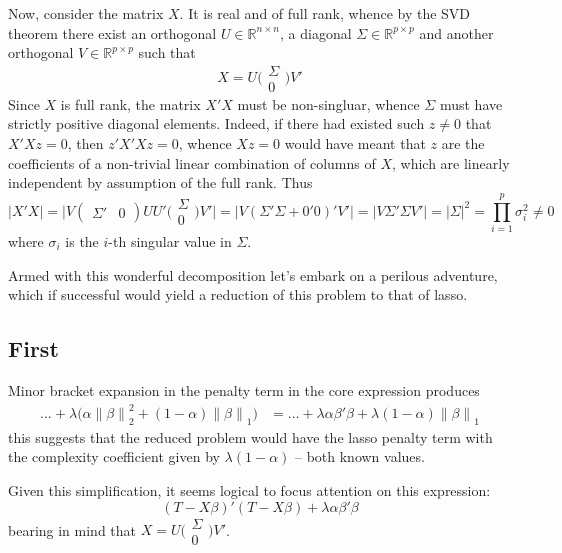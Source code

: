 \documentclass[a4paper]{article}
\newcommand{\nrm}[1]{{\left\| #1 \right \|}}
\newcommand{\Real}{\mathbb{R}}
\begin{document}
Now, consider the matrix $X$. It is real and of full rank, whence by the SVD
theorem there exist an orthogonal $U\in \Real^{n\times n}$, a diagonal $\Sigma\in \Real^{p\times p}$ and another orthogonal $V\in \Real^{p\times p}$ such that 
\[X = U \Big(\begin{smallmatrix}\Sigma \\ 0\end{smallmatrix}\Big) V'\]
Since $X$ is full rank, the matrix $X'X$ must be non-singluar, whence $\Sigma$ must have strictly positive diagonal elements. Indeed, if there had existed such $z\neq 0$ that $X'Xz = 0$, then $z'X'Xz = 0$, whence $Xz = 0$ would have meant that $z$ are the coefficients of a non-trivial linear combination of columns of $X$, which are linearly independent by assumption of the full rank. Thus
\[\lvert X'X \rvert =
\lvert V(\begin{smallmatrix}\Sigma' & 0\end{smallmatrix})UU'\Big(\begin{smallmatrix}\Sigma \\ 0\end{smallmatrix}\Big)V'\rvert
= \lvert V(\Sigma'\Sigma + 0'0)' V'\rvert = \lvert V\Sigma'\Sigma V'\rvert = \lvert \Sigma\rvert^2 = \prod_{i=1}^p \sigma_i^2 \neq 0\]
where $\sigma_i$ is the $i$-th singular value in $\Sigma$.

Armed with this wonderful decomposition let's embark on a perilous
adventure, which if successful would yield a reduction of this problem to
that of lasso.

\subsection*{First} %
\label{sub:first}

Minor bracket expansion in the penalty term in the core expression
produces
\begin{align*}
 	\ldots + \lambda\big( \alpha \nrm{\beta}_2^2 + (1-\alpha) \nrm{\beta}_1 \big) &= \ldots + \lambda \alpha \beta'\beta + \lambda (1-\alpha) \nrm{\beta}_1
\end{align*}
this suggests that the reduced problem would have the lasso penalty term with the complexity coefficient given by $\lambda(1-\alpha)$ -- both known values.

Given this simplification, it seems logical to focus attention on this expression:
\[(T-X\beta)'(T-X\beta) + \lambda \alpha \beta'\beta\]
bearing in mind that $X = U \Big(\begin{smallmatrix}\Sigma \\ 0\end{smallmatrix}\Big) V'$.
\end{document}
